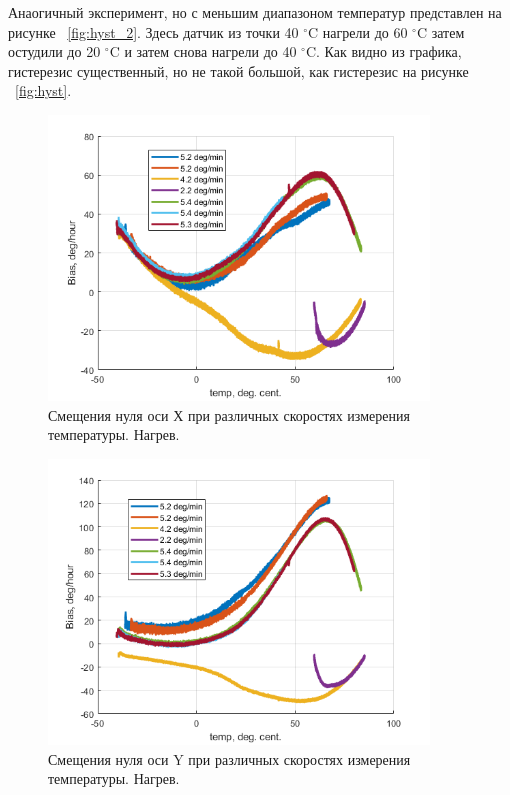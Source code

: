 \documentclass[a4paper,12pt]{article}
\begin{document}
Анаогичный эксперимент, но с меньшим диапазоном температур представлен на рисунке ~\ref{fig:hyst_2}. Здесь датчик из точки 40 $^{\circ}$C нагрели до 60 $^{\circ}$C затем остудили до 20 $^{\circ}$C и затем снова нагрели до 40 $^{\circ}$C. Как видно из графика, гистерезис существенный, но не такой большой, как гистерезис на рисунке ~\ref{fig:hyst}.

\begin{figure}[h]
\centering
\includegraphics[width=0.9\textwidth]{continius_wx_up.png} 
\caption{\label{fig:continius_wx_up}Смещения нуля оси Х при различных скоростях измерения температуры. Нагрев.}
\end{figure}
\begin{figure}[h]
\centering
\includegraphics[width=0.9\textwidth]{continius_wy_up.png} 
\caption{\label{fig:continius_wy_up}Смещения нуля оси Y при различных скоростях измерения температуры. Нагрев.}
\end{figure}
\end{document}
